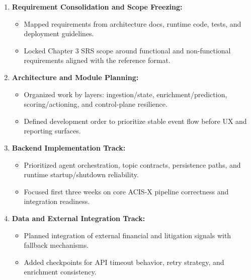 \documentclass[a4paper, 12pt]{report}
\begin{document}
\begin{enumerate}[itemsep=-4pt, label=\textbf{\roman*.}, itemsep=\parskip, parsep=0pt]
    \item \textbf{Requirement Consolidation and Scope Freezing: }
    \vspace{-4pt}
    \begin{itemize}[itemsep=-4pt]
        \item Mapped requirements from architecture docs, runtime code, tests, and deployment guidelines.
        \item Locked Chapter 3 SRS scope around functional and non-functional requirements aligned with the reference format.
    \end{itemize}

    \item \textbf{Architecture and Module Planning: }
    \vspace{-4pt}
    \begin{itemize}[itemsep=-4pt]
        \item Organized work by layers: ingestion/state, enrichment/prediction, scoring/actioning, and control-plane resilience.
        \item Defined development order to prioritize stable event flow before UX and reporting surfaces.
    \end{itemize}

    \item \textbf{Backend Implementation Track: }
    \vspace{-4pt}
    \begin{itemize}[itemsep=-4pt]
        \item Prioritized agent orchestration, topic contracts, persistence paths, and runtime startup/shutdown reliability.
        \item Focused first three weeks on core ACIS-X pipeline correctness and integration readiness.
    \end{itemize}

    \item \textbf{Data and External Integration Track: }
    \vspace{-4pt}
    \begin{itemize}[itemsep=-4pt]
        \item Planned integration of external financial and litigation signals with fallback mechanisms.
        \item Added checkpoints for API timeout behavior, retry strategy, and enrichment consistency.
    \end{itemize}


\end{enumerate}
\end{document}
